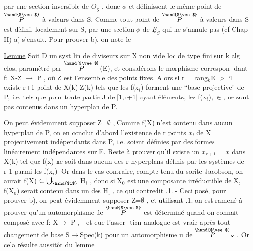 
par une section inversible de $\underline{O}_S$ , donc $\phi$ et \unsure{$\psi$} définissent le même point
de $\overset{\hand{$\vee$}}{P}$ à valeurs dans S. Comme tout point de $\overset{\hand{$\vee$}}{P}$ à valeurs dans S est défini,
localement sur S, par une section $\phi$ de $\underline{E}_S$ qui ne s'annule pas (cf Chap II)
a) s'ensuit.   Pour prouver b), on note le

\uline{Lemme}   Soit D un syst lin de diviseurs sur X non vide loc de type fini
sur k alg clos, paramétré par $\overset{\hand{$\vee$}}{P}$(E), et considérons le morphisme correspon-%
dant  f: X-Z $\longrightarrow$ P , où Z est l'ensemble des points fixes. Alors  si
r = rang$_k$E $>$ il existe  r+1 point de  X(k)-Z(k)  tels que les
f(x$_i$) forment une  ``base projective'' de P, i.e. tels que  pour toute
partie J de [1,r+1] ayant   éléments,  les  f(x$_i$),i$\in$,  ne sont pas
contenus dans un hyperplan de P.

On peut évidemment supposer Z=$\emptyset$ ,   Comme  f(X) n'est contenu dans
aucun hyperplan de P, on en conclut d'abord l'existence de r points
$x_i$ de X  projectivement indépendants dans P, i.e. soient définies
par des formes linéairement indépendantes sur E.   Reste à prouver qu'il
existe un  $x_{r+1} = x$   dans X(k) tel que  f(x) ne soit dans aucun des r
hyperplans  définis par les  systèmes de r-1 parmi les f(x$_i$). Or dans
le cas contraire, compte tenu du sorite Jacobson,  on aurait
f(X) $\subset \bigcup_{\hand{$i$}}$ H$_i$ , donc  si X$_0$  est une composante
irréductible de X, f(X$_0$) serait contenu dans un des H$_i$ , ce qui contredit
.1. - Ceci posé,  pour prouver b), on peut  évidemment supposer Z=$\emptyset$ ,
et utilisant .1.  on est ramené à prouver qu'un automorphisme de $\overset{\hand{$\vee$}}{P}$ est
déterminé quand on connait  composé avec f: X$\longrightarrow$ P , - et que l'asser-%
tion analogue est vraie après tout changement de base S$\rightarrow$Spec(k)
pour un  automorphisme u de $\overset{\hand{$\vee$}}{P}_S$  .  Or cela résulte aussitôt  du lemme

